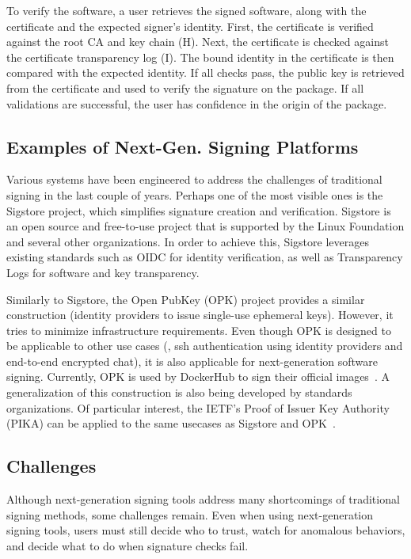 \documentclass{IEEEcsmagTechrxiv}
\begin{document}
To verify the software, a user retrieves the signed software, along with the certificate and the expected signer’s identity.
First, the certificate is verified against the root CA and key chain (H).
Next, the certificate is checked against the certificate transparency log (I).
The bound identity in the certificate is then compared with the expected identity.
If all checks pass, the public key is retrieved from the certificate and used to verify the signature on the package.
If all validations are successful, the user has confidence in the origin of the package.

\subsection{Examples of Next-Gen. Signing Platforms}

Various systems have been engineered to address the challenges of traditional signing in the last couple of years.
Perhaps one of the most visible ones is the Sigstore project, which simplifies signature creation and verification.
Sigstore is an open source and free-to-use project that is supported by the Linux Foundation and several other organizations.
In order to achieve this, Sigstore leverages existing standards such as OIDC for identity verification, as well as Transparency Logs for software and key transparency.

Similarly to Sigstore, the Open PubKey (OPK) project provides a similar construction (identity providers to issue single-use ephemeral keys).
However, it tries to minimize infrastructure requirements. 
Even though OPK is designed to be applicable to other use cases (\eg, ssh authentication using identity providers and end-to-end encrypted chat), it is also applicable for next-generation software signing.
Currently, OPK is used by DockerHub to sign their official images~\cite{DockerHubUsingOPK}. 
A generalization of this construction is also being developed by standards organizations.
Of particular interest, the IETF's Proof of Issuer Key Authority (PIKA) can be applied to the same usecases as Sigstore and OPK~\cite{PIKA}.

\subsection{Challenges}
Although next-generation signing tools address many shortcomings of traditional signing methods, some challenges remain.
Even when using next-generation signing tools, users must still decide who to trust, watch for anomalous behaviors, and decide what to do when signature checks fail.
\end{document}
